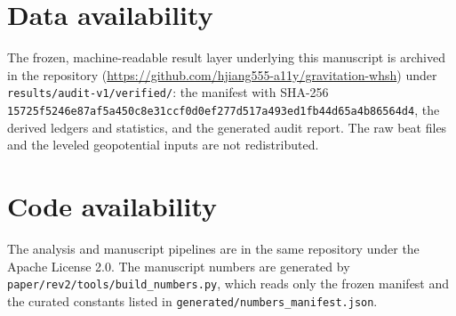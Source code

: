 \documentclass[11pt,a4paper]{article}
\begin{document}
\section*{Data availability}
The frozen, machine-readable result layer underlying this manuscript is
archived in the repository
(\url{https://github.com/hjiang555-a11y/gravitation-whsh}) under
\texttt{results/audit-v1/verified/}: the manifest with SHA-256
\texttt{15725f5246e87af5a450c8e31ccf0d0ef277d517a493ed1fb44d65a4b86564d4},
the derived ledgers and statistics, and the generated audit report. The raw
beat files and the leveled geopotential inputs are not redistributed.

\section*{Code availability}
The analysis and manuscript pipelines are in the same repository under the
Apache License 2.0. The manuscript numbers are generated by
\texttt{paper/rev2/tools/build\_numbers.py}, which reads only the frozen
manifest and the curated constants listed in
\texttt{generated/numbers\_manifest.json}.

\appendix

\end{document}
